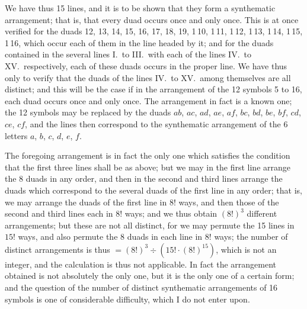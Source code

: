 \documentclass[11pt,a4paper]{book}
\begin{document}
We have thus 15 lines, and it is to be shown that they form a synthematic arrangement; that is, that every duad occurs once and only once. This is at once verified for the duads 12, 13, 14, 15, 16, 17, 18, 19, 1\,10, 1\,11, 1\,12, 1\,13, 1\,14, 1\,15, 1\,16, which occur each of them in the line headed by it; and for the duads contained in the several lines I.\ to III.\ with each of the lines IV.\ to XV.\ respectively, each of these duads occurs in the proper line. We have thus only to verify that the duads of the lines IV.\ to XV.\ among themselves are all distinct; and this will be the case if in the arrangement of the 12 symbols 5 to 16, each duad occurs once and only once. The arrangement in fact is a known one; the 12 symbols may be replaced by the duads $ab$, $ac$, $ad$, $ae$, $af$, $bc$, $bd$, $be$, $bf$, $cd$, $ce$, $cf$, and the lines then correspond to the synthematic arrangement of the 6 letters $a$, $b$, $c$, $d$, $e$, $f$.

The foregoing arrangement is in fact the only one which satisfies the condition that the first three lines shall be as above; but we may in the first line arrange the 8 duads in any order, and then in the second and third lines arrange the duads which correspond to the several duads of the first line in any order; that is, we may arrange the duads of the first line in $8!$ ways, and then those of the second and third lines each in $8!$ ways; and we thus obtain $(8!)^3$ different arrangements; but these are not all distinct, for we may permute the 15 lines in $15!$ ways, and also permute the 8 duads in each line in $8!$ ways; the number of distinct arrangements is thus $= (8!)^3 \div (15! \cdot (8!)^{15})$, which is not an integer, and the calculation is thus not applicable. In fact the arrangement obtained is not absolutely the only one, but it is the only one of a certain form; and the question of the number of distinct synthematic arrangements of 16 symbols is one of considerable difficulty, which I do not enter upon.
\end{document}
